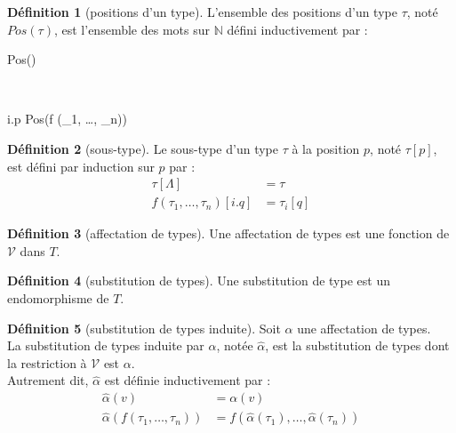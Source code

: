 \documentclass [a4paper,12pt] {article}
\theoremstyle {definition}
\newtheorem {définition} {Définition} [section]
\newcommand {\interval} [2] {[\![#1\,;#2]\!]}
\newcommand {\V} {\mathscr V}
\begin{document}
\begin {définition} [positions d'un type]
	L'ensemble des positions d'un type $\tau$, noté $Pos(\tau)$, est l'ensemble des mots sur $\mathbb N$ défini inductivement par :
	\begin {center}
		\begin {prooftree}
			 {\Lambda \in Pos(\tau)}
		\end {prooftree}
		~~~
		\begin {prooftree}
			\Hypo {i \in \interval 1 n}
			\Hypo {p \in Pos(\tau_i)}
			 {i.p \in Pos(f (\tau_1, \dots, \tau_n))}
		\end {prooftree}
	\end {center}
\end {définition}

\begin {définition} [sous-type]
	Le sous-type d'un type $\tau$ à la position $p$, noté $\tau [p]$, est défini par induction sur $p$ par :
	\begin {align*}
		\tau [\Lambda] &= \tau \\
		f (\tau_1, \dots, \tau_n) [i.q] &= \tau_i [q]
	\end {align*}
\end {définition}

\begin {définition} [affectation de types]
	Une affectation de types est une fonction de $\V$ dans $T$.
\end {définition}

\begin {définition} [substitution de types]
	Une substitution de type est un endomorphisme de $T$.
\end {définition}

\begin {définition} [substitution de types induite]
	Soit $\alpha$ une affectation de types. \\
	La substitution de types induite par $\alpha$, notée $\hat \alpha$, est la substitution de types dont la restriction à $\V$ est $\alpha$. \\
	Autrement dit, $\hat \alpha$ est définie inductivement par :
	\begin {align*}
		\hat \alpha (v) &= \alpha (v) \\
		\hat \alpha (f (\tau_1, \dots, \tau_n)) &= f (\hat \alpha (\tau_1), \dots, \hat \alpha (\tau_n))
	\end {align*}
\end {définition}
\end{document}
